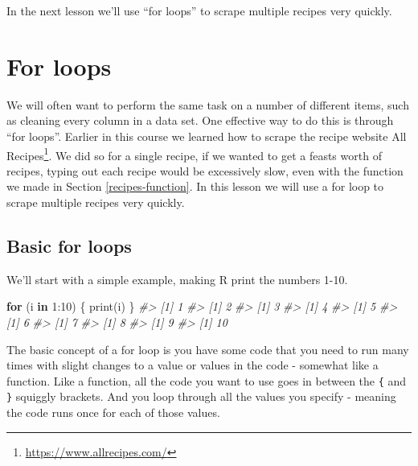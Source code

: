 \documentclass[
]{krantz}
\makeatletter
\newenvironment{Shaded}{\begin{snugshade}}{\end{snugshade}}
\newcommand{\CommentTok}[1]{\textcolor[rgb]{0.37,0.37,0.37}{\textit{#1}}}
\newcommand{\ControlFlowTok}[1]{\textcolor[rgb]{0.27,0.27,0.27}{\textbf{#1}}}
\newcommand{\DecValTok}[1]{\textcolor[rgb]{0.06,0.06,0.06}{#1}}
\newcommand{\FunctionTok}[1]{\textcolor[rgb]{0,0,0}{#1}}
\newcommand{\NormalTok}[1]{#1}
\newcommand{\SpecialCharTok}[1]{\textcolor[rgb]{0,0,0}{#1}}
\renewcommand{\href}[2]{#2\footnote{\url{#1}}}
\newenvironment{kframe}{%
\medskip{}
\setlength{\fboxsep}{.8em}
 \def\at@end@of@kframe{}%
 \ifinner\ifhmode%
  \def\at@end@of@kframe{\end{minipage}}%
  \begin{minipage}{\columnwidth}%
 \fi\fi%
 \def\FrameCommand##1{\hskip\@totalleftmargin \hskip-\fboxsep
 \colorbox{shadecolor}{##1}\hskip-\fboxsep
     \hskip-\linewidth \hskip-\@totalleftmargin \hskip\columnwidth}%
 \MakeFramed {\advance\hsize-\width
   \@totalleftmargin\z@ \linewidth\hsize
   \@setminipage}}%
 {\par\unskip\endMakeFramed%
 \at@end@of@kframe}
\renewenvironment{Shaded}{\begin{kframe}}{\end{kframe}}
\makeatother
\begin{document}
In the next lesson we'll use ``for loops'' to scrape multiple recipes very quickly.

\hypertarget{for-loops}{%
\chapter{For loops}\label{for-loops}}

We will often want to perform the same task on a number of different items, such as cleaning every column in a data set. One effective way to do this is through ``for loops''. Earlier in this course we learned how to scrape the recipe website \href{https://www.allrecipes.com/}{All Recipes}. We did so for a single recipe, if we wanted to get a feasts worth of recipes, typing out each recipe would be excessively slow, even with the function we made in Section \ref{recipes-function}. In this lesson we will use a for loop to scrape multiple recipes very quickly.

\hypertarget{basic-for-loops}{%
\section{Basic for loops}\label{basic-for-loops}}

We'll start with a simple example, making R print the numbers 1-10.

\begin{Shaded}
\begin{Highlighting}[]
\ControlFlowTok{for}\NormalTok{ (i }\ControlFlowTok{in} \DecValTok{1}\SpecialCharTok{:}\DecValTok{10}\NormalTok{) \{}
   \FunctionTok{print}\NormalTok{(i)}
\NormalTok{\}}
\CommentTok{\#\textgreater{} [1] 1}
\CommentTok{\#\textgreater{} [1] 2}
\CommentTok{\#\textgreater{} [1] 3}
\CommentTok{\#\textgreater{} [1] 4}
\CommentTok{\#\textgreater{} [1] 5}
\CommentTok{\#\textgreater{} [1] 6}
\CommentTok{\#\textgreater{} [1] 7}
\CommentTok{\#\textgreater{} [1] 8}
\CommentTok{\#\textgreater{} [1] 9}
\CommentTok{\#\textgreater{} [1] 10}
\end{Highlighting}
\end{Shaded}

The basic concept of a for loop is you have some code that you need to run many times with slight changes to a value or values in the code - somewhat like a function. Like a function, all the code you want to use goes in between the \texttt{\{} and \texttt{\}} squiggly brackets. And you loop through all the values you specify - meaning the code runs once for each of those values.
\end{document}
